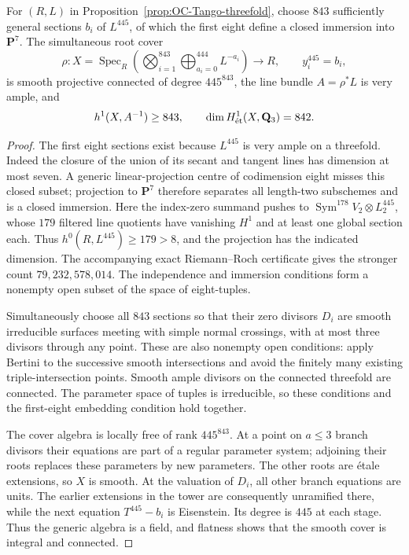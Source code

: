 \begin{lemma}
\label{lem:OC-threefold-multiroot}
For $(R,L)$ in Proposition~\ref{prop:OC-Tango-threefold}, choose $843$ sufficiently general sections $b_i$ of $L^{445}$, of which the first eight define a closed immersion into $\mathbf P^7$.  The simultaneous root cover
\[
 \rho:X=\operatorname{Spec}_R
  \left(\bigotimes_{i=1}^{843}\bigoplus_{a_i=0}^{444}L^{-a_i}\right)
       \longrightarrow R,
 \qquad y_i^{445}=b_i,
\]
is smooth projective connected of degree $445^{843}$, the line bundle $A=\rho^*L$ is very ample, and
\[
 h^1(X,A^{-1})\geq843,
 \qquad \dim H^1_{\et}(X,\mathbf Q_3)=842.
\]
\end{lemma}
\begin{proof}
The first eight sections exist because $L^{445}$ is very ample on a threefold.  Indeed the closure of the union of its secant and tangent lines has dimension at most seven.  A generic linear-projection centre of codimension eight misses this closed subset; projection to $\mathbf P^7$ therefore separates all length-two subschemes and is a closed immersion.  Here the index-zero summand pushes to $\operatorname{Sym}^{178}V_2\otimes L_2^{445}$, whose $179$ filtered line quotients have vanishing $H^1$ and at least one global section each.  Thus $h^0(R,L^{445})\geq179>8$, and the projection has the indicated dimension.  The accompanying exact Riemann--Roch certificate gives the stronger count $79{,}232{,}578{,}014$.  The independence and immersion conditions form a nonempty open subset of the space of eight-tuples.

Simultaneously choose all $843$ sections so that their zero divisors $D_i$ are smooth irreducible surfaces meeting with simple normal crossings, with at most three divisors through any point.  These are also nonempty open conditions: apply Bertini to the successive smooth intersections and avoid the finitely many existing triple-intersection points.  Smooth ample divisors on the connected threefold are connected.  The parameter space of tuples is irreducible, so these conditions and the first-eight embedding condition hold together.

The cover algebra is locally free of rank $445^{843}$.  At a point on $a\leq3$ branch divisors their equations are part of a regular parameter system; adjoining their roots replaces these parameters by new parameters.  The other roots are \'etale extensions, so $X$ is smooth.  At the valuation of $D_i$, all other branch equations are units.  The earlier extensions in the tower are consequently unramified there, while the next equation $T^{445}-b_i$ is Eisenstein.  Its degree is $445$ at each stage.  Thus the generic algebra is a field, and flatness shows that the smooth cover is integral and connected.


\end{proof}
